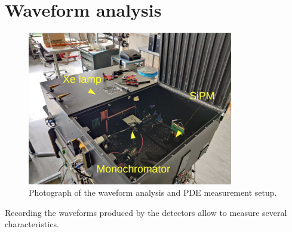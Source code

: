 \section{Waveform analysis}
\label{section:waveform analysis}

\begin{figure}[http]
    \centering
    \includegraphics[width=0.8\textwidth]{gfx/pictures/PDE_setup.png}
    \caption{Photograph of the waveform analysis and PDE measurement setup.}
    \label{fig:PDE setup pic}
\end{figure}
Recording the waveforms produced by the detectors allow to measure several characteristics. 
